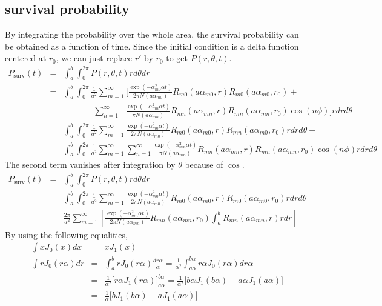 \documentclass{article}
\begin{document}
\subsection{survival probability}

By integrating the probability over the whole area, the survival probability
can be obtained as a function of time. Since the initial condition is a delta function
centered at $r_0$, we can just replace $r'$ by $r_0$ to get $P(r, \theta, t)$.
\begin{eqnarray}
    P_{\mathrm{surv}}(t) &=& \int_a^b \int_0^{2\pi} P(r, \theta, t) rd\theta dr
\nonumber\\
    &=& \int_a^b \int_0^{2\pi}
        \frac{1}{a^2} \sum_{m=1}^{\infty} \Bigg[
        \frac{\exp(-\alpha_{m0}^2\alpha t)}{2\pi N(a\alpha_{m0})}
        R_{m0}(a\alpha_{m0}, r) R_{m0}(a\alpha_{m0}, r_0) +
\nonumber\\
        & &\ \ \ \ \ \ \ \ \ \ \ \ \ \ \ \ \sum_{n=1}^{\infty}\ \ \ 
        \frac{\exp(-\alpha_{mn}^2\alpha t)}{\pi N(a\alpha_{mn})}
        R_{mn}(a\alpha_{mn}, r) R_{mn}(a\alpha_{mn}, r_0)\cos(n\phi)\Bigg] rdrd\theta
\nonumber\\
    &=& \int_a^b \int_0^{2\pi}
        \frac{1}{a^2} \sum_{m=1}^{\infty}
        \frac{\exp(-\alpha_{m0}^2\alpha t)}{2\pi N(a\alpha_{m0})}
        R_{m0}(a\alpha_{m0}, r) R_{mn}(a\alpha_{m0}, r_0) rdrd\theta +
\nonumber\\
    & & \int_a^b \int_0^{2\pi}
        \frac{1}{a^2} \sum_{m=1}^{\infty}\sum_{n=1}^{\infty}
        \frac{\exp(-\alpha_{mn}^2\alpha t)}{\pi N(a\alpha_{mn})}
        R_{mn}(a\alpha_{mn}, r) R_{mn}(a\alpha_{mn}, r_0)\cos(n\phi) rdrd\theta
\nonumber
\end{eqnarray}
%
The second term vanishes after integration by $\theta$ because of $\cos$.
%
\begin{eqnarray}
    P_{\mathrm{surv}}(t) &=& \int_a^b \int_0^{2\pi} P(r, \theta, t) rd\theta dr
\nonumber\\
    &=& \int_a^b \int_0^{2\pi}
        \frac{1}{a^2} \sum_{m=1}^{\infty}
        \frac{\exp(-\alpha_{m0}^2\alpha t)}{2\pi N(a\alpha_{m0})}
        R_{m0}(a\alpha_{m0}, r) R_{m0}(a\alpha_{m0}, r_0) rdrd\theta
\nonumber\\
    &=& \frac{2\pi}{a^2} \sum_{m=1}^{\infty} \left[
        \frac{\exp(-\alpha_{mn}^2\alpha t)}{2\pi N(a\alpha_{mn})}
        R_{mn}(a\alpha_{mn}, r_0) \int_a^b R_{mn}(a\alpha_{mn}, r) rdr\right]
\nonumber
\end{eqnarray}
%
By using the following equalities,
%
\begin{eqnarray}
    \int xJ_0(x) dx &=& xJ_1(x)
\nonumber\\
    \int rJ_0(r\alpha) dr
    &=& \int_a^b rJ_0(r\alpha) \frac{dr\alpha}{\alpha}
     =  \frac{1}{\alpha^2} \int_{a\alpha}^{b\alpha} r\alpha J_0(r\alpha)dr\alpha
\nonumber\\
    &=& \frac{1}{\alpha^2} \Big[ r\alpha J_1(r\alpha) \Big]_{a\alpha}^{b\alpha}
     =  \frac{1}{\alpha^2} \Big[ b\alpha J_1(b\alpha) - a\alpha J_1(a\alpha) \Big]
\nonumber\\
    &=& \frac{1}{\alpha} \Big[ bJ_1(b\alpha) - aJ_1(a\alpha) \Big]
\end{eqnarray}
\end{document}
